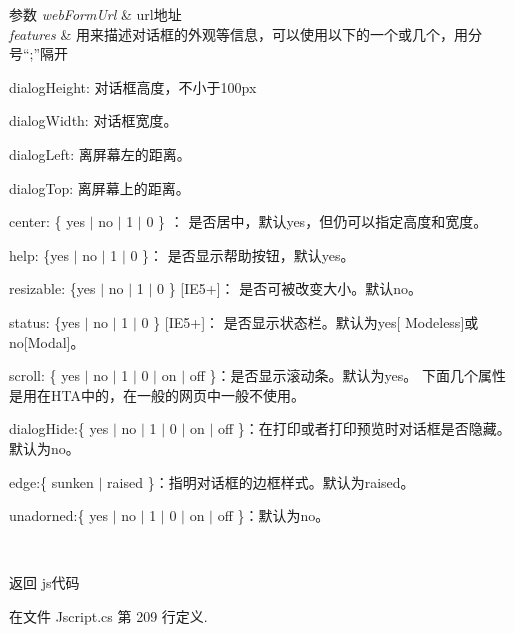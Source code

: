 \begin{DoxyParams}{参数}
{\em web\-Form\-Url} & url地址\\
\hline
{\em features} & 用来描述对话框的外观等信息，可以使用以下的一个或几个，用分号“;”隔开
\begin{DoxyEnumerate}
\item dialog\-Height\-: 对话框高度，不小于100px
\item dialog\-Width\-: 对话框宽度。
\item dialog\-Left\-: 离屏幕左的距离。
\item dialog\-Top\-: 离屏幕上的距离。
\item center\-: \{ yes $|$ no $|$ 1 $|$ 0 \} ： 是否居中，默认yes，但仍可以指定高度和宽度。
\item help\-: \{yes $|$ no $|$ 1 $|$ 0 \}： 是否显示帮助按钮，默认yes。
\item resizable\-: \{yes $|$ no $|$ 1 $|$ 0 \} \mbox{[}I\-E5+\mbox{]}： 是否可被改变大小。默认no。
\item status\-: \{yes $|$ no $|$ 1 $|$ 0 \} \mbox{[}I\-E5+\mbox{]}： 是否显示状态栏。默认为yes\mbox{[} Modeless\mbox{]}或no\mbox{[}Modal\mbox{]}。
\item scroll\-: \{ yes $|$ no $|$ 1 $|$ 0 $|$ on $|$ off \}：是否显示滚动条。默认为yes。 下面几个属性是用在\-H\-T\-A中的，在一般的网页中一般不使用。
\item dialog\-Hide\-:\{ yes $|$ no $|$ 1 $|$ 0 $|$ on $|$ off \}：在打印或者打印预览时对话框是否隐藏。默认为no。
\item edge\-:\{ sunken $|$ raised \}：指明对话框的边框样式。默认为raised。
\item unadorned\-:\{ yes $|$ no $|$ 1 $|$ 0 $|$ on $|$ off \}：默认为no。 
\end{DoxyEnumerate}\\
\hline
\end{DoxyParams}
\begin{DoxyReturn}{返回}
js代码
\end{DoxyReturn}


在文件 Jscript.\-cs 第 209 行定义.

